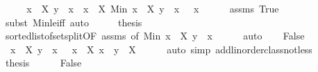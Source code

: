 \begin{isabellebody}
\ \ \isamarkupfalse%
\ \isamarkupfalse%
\ {\isachardoublequoteopen}{\isacharbraceleft}{\kern0pt}x\ {\isasymin}\ X{\isachardot}{\kern0pt}\ y\ {\isacharless}{\kern0pt}\ x{\isacharbraceright}{\kern0pt}\ {\isacharequal}{\kern0pt}\ {\isacharbraceleft}{\kern0pt}x\ {\isasymin}\ X{\isachardot}{\kern0pt}\ Min\ {\isacharbraceleft}{\kern0pt}x\ {\isasymin}\ X{\isachardot}{\kern0pt}\ y\ {\isacharless}{\kern0pt}\ x{\isacharbraceright}{\kern0pt}\ {\isasymle}\ \ x{\isacharbraceright}{\kern0pt}{\isachardoublequoteclose}\isanewline
\ \ \ \ \isamarkupfalse%
\ assms\ True\isanewline
\ \ \ \ \isamarkupfalse%
\ {\isacharparenleft}{\kern0pt}subst\ Min{\isacharunderscore}{\kern0pt}le{\isacharunderscore}{\kern0pt}iff{\isacharparenright}{\kern0pt}\ auto\isanewline
\ \ \isamarkupfalse%
\ \isamarkupfalse%
\ {\isacharquery}{\kern0pt}thesis\isanewline
\ \ \ \ \isamarkupfalse%
\ sorted{\isacharunderscore}{\kern0pt}list{\isacharunderscore}{\kern0pt}of{\isacharunderscore}{\kern0pt}set{\isacharunderscore}{\kern0pt}split{\isacharbrackleft}{\kern0pt}OF\ assms{\isacharcomma}{\kern0pt}\ of\ {\isachardoublequoteopen}Min\ {\isacharbraceleft}{\kern0pt}x\ {\isasymin}\ X{\isachardot}{\kern0pt}\ y\ {\isacharless}{\kern0pt}\ x{\isacharbraceright}{\kern0pt}{\isachardoublequoteclose}{\isacharbrackright}{\kern0pt}\isanewline
\ \ \ \ \isamarkupfalse%
\ auto\isanewline
{}\isamarkupfalse%
\isanewline
\ \ \isamarkupfalse%
\ False\isanewline
\ \ \isamarkupfalse%
\ {\isacharasterisk}{\kern0pt}{\isacharcolon}{\kern0pt}\ {\isachardoublequoteopen}{\isacharbraceleft}{\kern0pt}x\ {\isasymin}\ X{\isachardot}{\kern0pt}\ y\ {\isacharless}{\kern0pt}\ x{\isacharbraceright}{\kern0pt}\ {\isacharequal}{\kern0pt}\ {\isacharbraceleft}{\kern0pt}{\isacharbraceright}{\kern0pt}{\isachardoublequoteclose}\ {\isachardoublequoteopen}{\isacharbraceleft}{\kern0pt}x\ {\isasymin}\ X{\isachardot}{\kern0pt}\ x\ {\isasymle}\ y{\isacharbraceright}{\kern0pt}\ {\isacharequal}{\kern0pt}\ X{\isachardoublequoteclose}\isanewline
\ \ \ \ \isamarkupfalse%
\ {\isacharparenleft}{\kern0pt}auto\ simp\ add{\isacharcolon}{\kern0pt}linorder{\isacharunderscore}{\kern0pt}class{\isachardot}{\kern0pt}not{\isacharunderscore}{\kern0pt}less{\isacharparenright}{\kern0pt}\isanewline
\ \ \isamarkupfalse%
\ {\isacharquery}{\kern0pt}thesis\isanewline
\ \ \ \ \isamarkupfalse%
\ False\isanewline
\ \ \ \ \isamarkupfalse%

\end{isabellebody}
